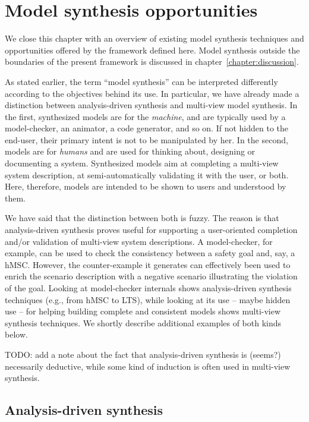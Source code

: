 \section{Model synthesis opportunities\label{section:background-discussion}}

We close this chapter with an overview of existing model synthesis techniques and opportunities offered by the framework defined here. Model synthesis outside the boundaries of the present framework is discussed in chapter~\ref{chapter:discussion}.

As stated earlier, the term ``model synthesis'' can be interpreted differently according to the objectives behind its use. In particular, we have already made a distinction between analysis-driven synthesis and multi-view model synthesis. In the first, synthesized models are for the \emph{machine}, and are typically used by a model-checker, an animator, a code generator, and so on. If not hidden to the end-user, their primary intent is not to be manipulated by her. In the second, models are for \emph{humans} and are used for thinking about, designing or documenting a system. Synthesized models aim at completing a multi-view system description, at semi-automatically validating it with the user, or both. Here, therefore, models are intended to be shown to users and understood by them.

We have said that the distinction between both is fuzzy. The reason is that analysis-driven synthesis proves useful for supporting a user-oriented completion and/or validation of multi-view system descriptions. A model-checker, for example, can be used to check the consistency between a safety goal and, say, a hMSC. However, the counter-example it generates can effectively been used to enrich the scenario description with a negative scenario illustrating the violation of the goal. Looking at model-checker internals shows analysis-driven synthesis techniques (e.g., from hMSC to LTS), while looking at its use -- maybe hidden use -- for helping building complete and consistent models shows multi-view synthesis techniques. We shortly describe additional examples of both kinds below.

TODO: add a note about the fact that analysis-driven synthesis is (seems?) necessarily deductive, while some kind of induction is often used in multi-view synthesis.

\subsection*{Analysis-driven synthesis}

